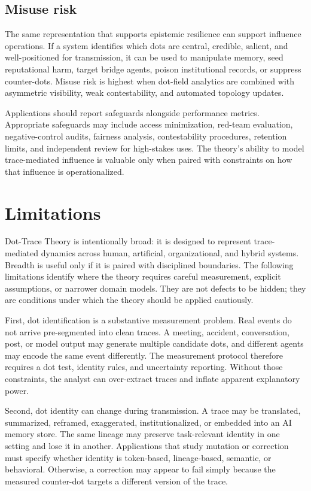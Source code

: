 \documentclass[11pt]{article}
\theoremstyle{remark}
\begin{document}
\subsection{Misuse risk}\label{misuse-risk}

The same representation that supports epistemic resilience can support influence operations. If a system identifies which dots are central, credible, salient, and well-positioned for transmission, it can be used to manipulate memory, seed reputational harm, target bridge agents, poison institutional records, or suppress counter-dots. Misuse risk is highest when dot-field analytics are combined with asymmetric visibility, weak contestability, and automated topology updates.

Applications should report safeguards alongside performance metrics. Appropriate safeguards may include access minimization, red-team evaluation, negative-control audits, fairness analysis, contestability procedures, retention limits, and independent review for high-stakes uses. The theory's ability to model trace-mediated influence is valuable only when paired with constraints on how that influence is operationalized.

\section{Limitations}\label{limitations}

Dot-Trace Theory is intentionally broad: it is designed to represent trace-mediated dynamics across human, artificial, organizational, and hybrid systems. Breadth is useful only if it is paired with disciplined boundaries. The following limitations identify where the theory requires careful measurement, explicit assumptions, or narrower domain models. They are not defects to be hidden; they are conditions under which the theory should be applied cautiously.

First, dot identification is a substantive measurement problem. Real events do not arrive pre-segmented into clean traces. A meeting, accident, conversation, post, or model output may generate multiple candidate dots, and different agents may encode the same event differently. The measurement protocol therefore requires a dot test, identity rules, and uncertainty reporting. Without those constraints, the analyst can over-extract traces and inflate apparent explanatory power.

Second, dot identity can change during transmission. A trace may be translated, summarized, reframed, exaggerated, institutionalized, or embedded into an AI memory store. The same lineage may preserve task-relevant identity in one setting and lose it in another. Applications that study mutation or correction must specify whether identity is token-based, lineage-based, semantic, or behavioral. Otherwise, a correction may appear to fail simply because the measured counter-dot targets a different version of the trace.
\end{document}
